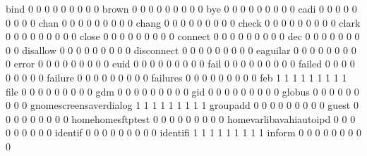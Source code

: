 \documentclass[compress,8pt]{beamer}
\begin{document}
\begin{frame}
\begin{Schunk}
  bind                                       0   0   0   0   0   0   0   0   0
  brown                                      0   0   0   0   0   0   0   0   0
  bye                                        0   0   0   0   0   0   0   0   0
  cadi                                       0   0   0   0   0   0   0   0   0
  chan                                       0   0   0   0   0   0   0   0   0
  chang                                      0   0   0   0   0   0   0   0   0
  check                                      0   0   0   0   0   0   0   0   0
  clark                                      0   0   0   0   0   0   0   0   0
  close                                      0   0   0   0   0   0   0   0   0
  connect                                    0   0   0   0   0   0   0   0   0
  dec                                        0   0   0   0   0   0   0   0   0
  disallow                                   0   0   0   0   0   0   0   0   0
  disconnect                                 0   0   0   0   0   0   0   0   0
  eaguilar                                   0   0   0   0   0   0   0   0   0
  error                                      0   0   0   0   0   0   0   0   0
  euid                                       0   0   0   0   0   0   0   0   0
  fail                                       0   0   0   0   0   0   0   0   0
  failed                                     0   0   0   0   0   0   0   0   0
  failure                                    0   0   0   0   0   0   0   0   0
  failures                                   0   0   0   0   0   0   0   0   0
  feb                                        1   1   1   1   1   1   1   1   1
  file                                       0   0   0   0   0   0   0   0   0
  gdm                                        0   0   0   0   0   0   0   0   0
  gid                                        0   0   0   0   0   0   0   0   0
  globus                                     0   0   0   0   0   0   0   0   0
  gnomescreensaverdialog                     1   1   1   1   1   1   1   1   1
  groupadd                                   0   0   0   0   0   0   0   0   0
  guest                                      0   0   0   0   0   0   0   0   0
  homehomesftptest                           0   0   0   0   0   0   0   0   0
  homevarlibavahiautoipd                     0   0   0   0   0   0   0   0   0
  identif                                    0   0   0   0   0   0   0   0   0
  identifi                                   1   1   1   1   1   1   1   1   1
  inform                                     0   0   0   0   0   0   0   0   0

\end{Schunk}
\end{frame}
\end{document}
